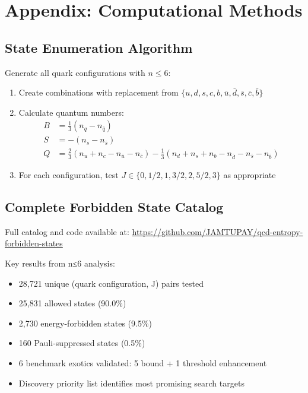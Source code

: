 \documentclass[12pt,a4paper]{article}
\begin{document}
\appendix

\section{Appendix: Computational Methods}

\subsection{State Enumeration Algorithm}

Generate all quark configurations with $n \leq 6$:

\begin{enumerate}
\item Create combinations with replacement from $\{u,d,s,c,b,\bar{u},\bar{d},\bar{s},\bar{c},\bar{b}\}$
\item Calculate quantum numbers:
\begin{align}
B &= \frac{1}{3}(n_q - n_{\bar{q}}) \\
S &= -(n_s - n_{\bar{s}}) \\
Q &= \frac{2}{3}(n_u + n_c - n_{\bar{u}} - n_{\bar{c}}) - \frac{1}{3}(n_d + n_s + n_b - n_{\bar{d}} - n_{\bar{s}} - n_{\bar{b}})
\end{align}
\item For each configuration, test $J \in \{0, 1/2, 1, 3/2, 2, 5/2, 3\}$ as appropriate
\end{enumerate}

\subsection{Complete Forbidden State Catalog}

Full catalog and code available at: \url{https://github.com/JAMTUPAY/qcd-entropy-forbidden-states}

Key results from n≤6 analysis:
\begin{itemize}
\item 28,721 unique (quark configuration, J) pairs tested
\item 25,831 allowed states (90.0\%)
\item 2,730 energy-forbidden states (9.5\%)
\item 160 Pauli-suppressed states (0.5\%)
\item 6 benchmark exotics validated: 5 bound + 1 threshold enhancement
\item Discovery priority list identifies most promising search targets
\end{itemize}
\end{document}
